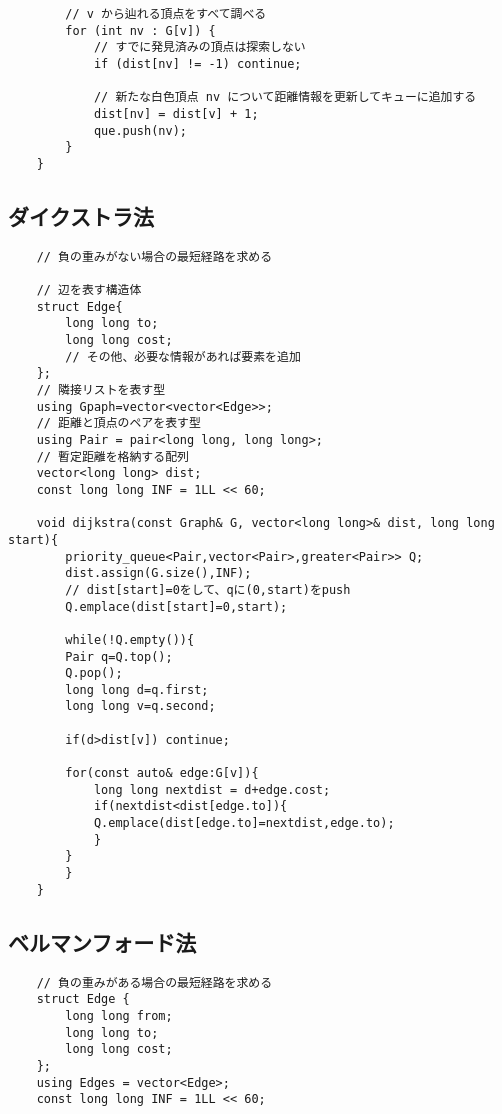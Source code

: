 \documentclass[a4paper, landscape, 9pt]{jarticle} %
\begin{document}
\begin{multicols*}{3}
\begin{lstlisting}
        // v から辿れる頂点をすべて調べる
        for (int nv : G[v]) {
            // すでに発見済みの頂点は探索しない
            if (dist[nv] != -1) continue; 

            // 新たな白色頂点 nv について距離情報を更新してキューに追加する
            dist[nv] = dist[v] + 1;
            que.push(nv);
        }
    }
    \end{lstlisting}

    \subsection{ダイクストラ法}
    \begin{lstlisting}
    // 負の重みがない場合の最短経路を求める

    // 辺を表す構造体
    struct Edge{
        long long to;
        long long cost;
        // その他、必要な情報があれば要素を追加
    };
    // 隣接リストを表す型
    using Gpaph=vector<vector<Edge>>;
    // 距離と頂点のペアを表す型
    using Pair = pair<long long, long long>; 
    // 暫定距離を格納する配列
    vector<long long> dist; 
    const long long INF = 1LL << 60;
    
    void dijkstra(const Graph& G, vector<long long>& dist, long long start){
        priority_queue<Pair,vector<Pair>,greater<Pair>> Q;
        dist.assign(G.size(),INF);
        // dist[start]=0をして、qに(0,start)をpush
        Q.emplace(dist[start]=0,start); 
    
        while(!Q.empty()){
        Pair q=Q.top();
        Q.pop();
        long long d=q.first;
        long long v=q.second;
    
        if(d>dist[v]) continue;
    
        for(const auto& edge:G[v]){
            long long nextdist = d+edge.cost;
            if(nextdist<dist[edge.to]){
            Q.emplace(dist[edge.to]=nextdist,edge.to);
            }
        }
        }
    }
    \end{lstlisting}

    \subsection{ベルマンフォード法}
    \begin{lstlisting}
    // 負の重みがある場合の最短経路を求める
    struct Edge {
        long long from;
        long long to;
        long long cost;
    };
    using Edges = vector<Edge>;
    const long long INF = 1LL << 60;
    

\end{lstlisting}
\end{multicols*}
\end{document}
